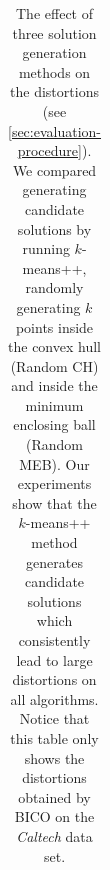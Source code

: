 \begin{longtable}{llrlll}
\caption{The effect of three solution generation methods on the distortions (see \cref{sec:evaluation-procedure}). We compared generating candidate solutions by running $k$-means++, randomly generating $k$ points inside the convex hull (Random CH) and inside the minimum enclosing ball (Random MEB). Our experiments show that the $k$-means++ method generates candidate solutions which consistently lead to large distortions on all algorithms. Notice that this table only shows the distortions obtained by BICO on the \textit{Caltech} data set.}
\label{tab:comparison-solution-generation}
\end{longtable}




